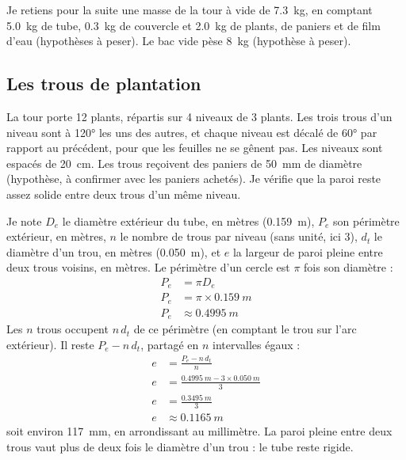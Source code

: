 Je retiens pour la suite une masse de la tour à vide de \qty{7,3}{kg}, en comptant \qty{5,0}{kg} de tube, \qty{0,3}{kg} de couvercle et \qty{2,0}{kg} de plants, de paniers et de film d'eau (hypothèses à peser). Le bac vide pèse \qty{8}{kg} (hypothèse à peser).

\subsection{Les trous de plantation}

La tour porte 12 plants, répartis sur 4 niveaux de 3 plants. Les trois trous d'un niveau sont à \ang{120} les uns des autres, et chaque niveau est décalé de \ang{60} par rapport au précédent, pour que les feuilles ne se gênent pas. Les niveaux sont espacés de \qty{20}{cm}. Les trous reçoivent des paniers de \qty{50}{mm} de diamètre (hypothèse, à confirmer avec les paniers achetés). Je vérifie que la paroi reste assez solide entre deux trous d'un même niveau.

\begin{demonstration}
Je note $D_e$ le diamètre extérieur du tube, en mètres (\qty{0,159}{m}), $P_e$ son périmètre extérieur, en mètres, $n$ le nombre de trous par niveau (sans unité, ici 3), $d_t$ le diamètre d'un trou, en mètres (\qty{0,050}{m}), et $e$ la largeur de paroi pleine entre deux trous voisins, en mètres. Le périmètre d'un cercle est $\pi$ fois son diamètre :
\begin{align*}
P_e &= \pi D_e\\
P_e &= \pi \times \qty{0,159}{m}\\
P_e &\approx \qty{0,4995}{m}
\end{align*}
Les $n$ trous occupent $n\,d_t$ de ce périmètre (en comptant le trou sur l'arc extérieur). Il reste $P_e - n\,d_t$, partagé en $n$ intervalles égaux :
\begin{align*}
e &= \frac{P_e - n\,d_t}{n}\\
e &= \frac{\qty{0,4995}{m} - 3 \times \qty{0,050}{m}}{3}\\
e &= \frac{\qty{0,3495}{m}}{3}\\
e &\approx \qty{0,1165}{m}
\end{align*}
soit environ \qty{117}{mm}, en arrondissant au millimètre. La paroi pleine entre deux trous vaut plus de deux fois le diamètre d'un trou : le tube reste rigide.
\end{demonstration}

